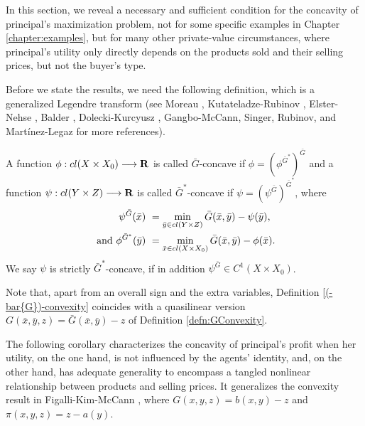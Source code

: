 In this section, we reveal a necessary and sufficient condition  for the concavity of principal's maximization problem, not for some specific examples in Chapter \ref{chapter:examples}, but for many other private-value circumstances, where principal's utility only directly depends on the products sold and their selling prices, but not the buyer's type. 
\medskip


	Before we state the results, we need the following definition, which is a generalized Legendre transform 
	(see Moreau \cite{Moreau70}, Kutateladze-Rubinov \cite{KutateladzeRubinov72}, Elster-Nehse \cite{ElsterNehse74}, Balder \cite{Balder77}, Dolecki-Kurcyusz \cite{DoleckiKurcyusz78}, Gangbo-McCann\cite{GangboMcCann96}, Singer\cite{Singer97}, Rubinov\cite{Rubinov00a, Rubinov00b}, and Mart\'inez-Legaz \cite{MartinezLegaz05} 
	for more references).  
	\medskip
	
	
	
	\begin{definition}\label{(-bar{G})-convexity}
		A function $\phi: cl(X \times X_0) \longrightarrow {\mathbf R}$ is called $\bar{G}$-concave if $\phi = (\phi^{\bar{G}^*})^{\bar{G}}$ and a function $\psi: cl( Y \times Z) \longrightarrow {\mathbf R}$ is called $\bar{G}^*$-concave if $\psi = (\psi^{\bar{G}})^{\bar{G}^*}$, where 
		\begin{equation}\label{(-bar{G})-transform}
		\begin{split}
		\psi^{\bar{G}}(\bar{x})&~=\min_{\bar{y} \in cl( Y \times Z)} \bar{G}(\bar{x},\bar{y}) - \psi(\bar{y}),\\ \text{ and } \phi^{\bar{G}^*}(\bar{y})&~= \min_{\bar{x} \in cl(X \times X_0)} \bar{G}(\bar{x}, \bar{y}) - \phi(\bar{x}).
		\end{split}
		\end{equation}
		We say $\psi$ is strictly $\bar{G}^*$-concave, if in addition $\psi^{\bar G} \in C^1(X\times X_0)$. 
	\end{definition}
	
	Note that,  apart from an overall sign and the extra variables,
	Definition \ref{(-bar{G})-convexity} coincides with a quasilinear version $G(\bar{x},\bar{y},z) = \bar{G}(\bar{x},\bar{y})-z$ of
	Definition \ref{defn:GConvexity}.
	\medskip
	
	
	The following corollary characterizes the concavity of principal's profit when her utility, on the one hand, is not influenced by the agents' identity, and, on the other hand, has adequate generality to encompass a
	tangled nonlinear relationship between products and selling prices. It generalizes the convexity result in Figalli-Kim-McCann \cite{FigalliKimMcCann11}, where $G(x,y,z) = b(x,y)-z$ and $\pi(x,y,z) = z-a(y)$. 
	\medskip
	
